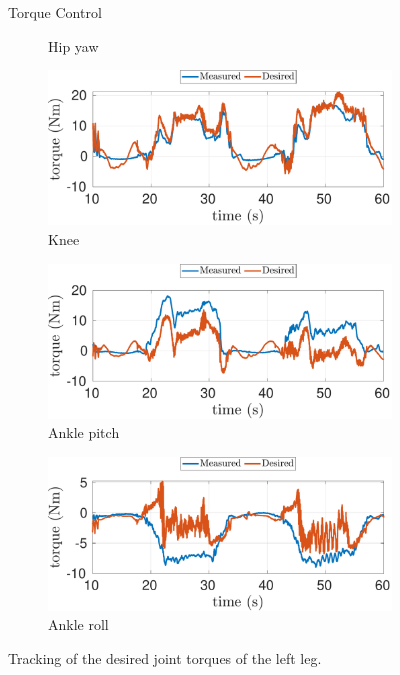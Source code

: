 \begin{figure}[!h]
\begin{myframe}{Torque Control}
\begin{subfigure}[b]{0.48\textwidth}
        \caption{Hip yaw}
        \label{fig:real-hip_yaw_trq}
    \end{subfigure}
    \begin{subfigure}[b]{0.48\textwidth}
        \centering
        \includegraphics[width=\textwidth]{chapter_wbc_benchmarking/figures/torq-real-l_knee_trq.pdf}
        \caption{Knee}
        \label{fig:real-knee_trq}
    \end{subfigure} 
    \hfill
        \begin{subfigure}[b]{0.48\textwidth}
        \centering
        \includegraphics[width=\textwidth]{chapter_wbc_benchmarking/figures/torq-real-l_ankle_pitch_trq.pdf}
        \caption{Ankle pitch}
        \label{fig:real-ankle_pitch_trq}
    \end{subfigure} 
     \hfill
    \begin{subfigure}[b]{0.48\textwidth}
        \centering
        \includegraphics[width=\textwidth]{chapter_wbc_benchmarking/figures/torq-real-l_ankle_roll_trq.pdf}
        \caption{Ankle roll}
        \label{fig:real-ankle_roll_trq}
    \end{subfigure}
    \end{myframe}
    \caption{Tracking of the desired joint torques of the left leg.}
    \label{fig:joint_trq}
\end{figure}

